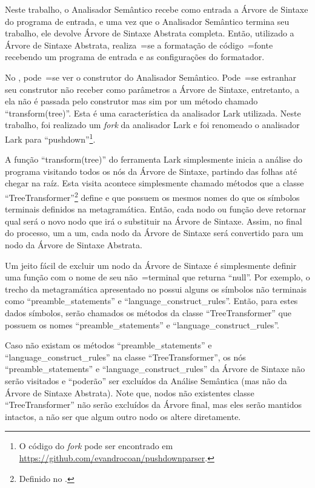 Neste trabalho,
o Analisador Semântico recebe como entrada a Árvore de Sintaxe do programa de entrada,
e uma vez que o Analisador Semântico termina seu trabalho,
ele devolve Árvore de Sintaxe Abstrata completa.
Então,
utilizado a Árvore de Sintaxe Abstrata,
realiza~=se a formatação de código~=fonte recebendo um programa de entrada e
as configurações do formatador.

No ,
pode~=se ver o construtor do Analisador Semântico.
Pode~=se estranhar seu construtor não receber como parâmetros a Árvore de Sintaxe,
entretanto,
a ela não é passada pelo construtor mas sim por um método chamado ``transform(tree)''.
Esta é uma característica da analisador Lark utilizada.
Neste trabalho,
foi realizado um \textit{fork} \cite{overviewOfGitHubForks,mayTheForkBeWithYou,collaborationAmongGitHubUsers} da analisador Lark e
foi renomeado o analisador Lark para ``pushdown''\footnote{%
O código do \textit{fork} pode ser encontrado em \url{https://github.com/evandrocoan/pushdownparser}.
}.

A função ``transform(tree)'' do ferramenta Lark simplesmente inicia a análise do programa visitando todos os nós da Árvore de Sintaxe,
partindo das folhas até chegar na raíz.
Esta visita acontece simplesmente chamado métodos que a classe ``TreeTransformer''\footnote{%
Definido no .
} define e
que possuem os mesmos nomes do que os símbolos terminais definidos na metagramática.
Então,
cada nodo ou
função deve retornar qual será o novo nodo que irá o substituir na Árvore de Sintaxe.
Assim,
no final do processo,
um a um,
cada nodo da Árvore de Sintaxe será convertido para um nodo da Árvore de Sintaxe Abstrata.

Um jeito fácil de excluir um nodo da Árvore de Sintaxe é simplesmente definir uma função com o nome de seu não~=terminal que returna ``null''.
Por exemplo,
o trecho da metagramática apresentado no  possui alguns os símbolos não terminais como ``preamble\_statements'' e
``language\_construct\_rules''. Então,
para estes dados símbolos,
serão chamados os métodos da classe ``TreeTransformer'' que possuem os nomes ``preamble\_statements'' e
``language\_construct\_rules''.

Caso não existam os métodos ``preamble\_statements'' e
``language\_construct\_rules'' na classe ``TreeTransformer'',
os nós ``preamble\_statements'' e
``language\_construct\_rules'' da Árvore de Sintaxe não serão visitados e
``poderão'' ser excluídos da Análise Semântica (mas não da Árvore de Sintaxe Abstrata).
Note que,
nodos não existentes classe ``TreeTransformer'' não serão excluídos da Árvore final,
mas eles serão mantidos intactos,
a não ser que algum outro nodo os altere diretamente.

